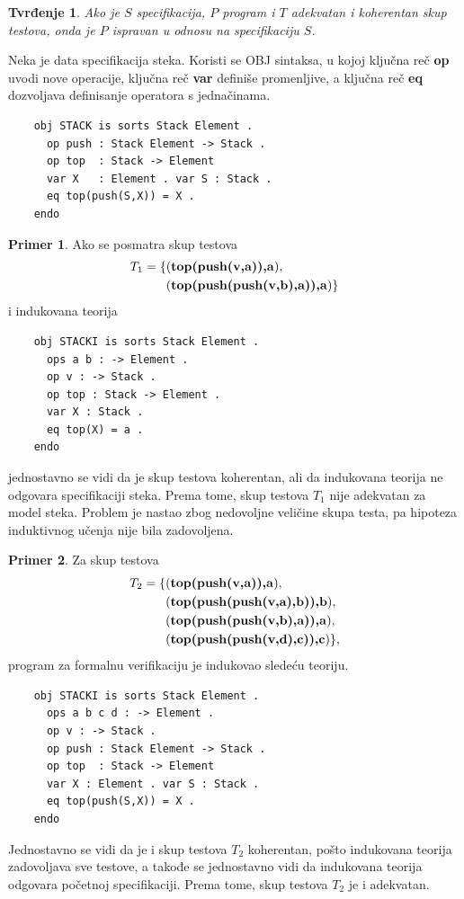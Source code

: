 \documentclass[a4paper]{article}
\newtheorem*{tvrdjenje}{Tvrđenje}
\theoremstyle{definition}
\newtheorem{primer}{Primer}[section]
\begin{document}
{\begin{tvrdjenje}
Ako je $S$ specifikacija, $P$ program i $T$ adekvatan i koherentan skup testova, onda je $P$ ispravan u odnosu na specifikaciju $S$.
\end{tvrdjenje}

Neka je data specifikacija steka. Koristi se OBJ sintaksa, u kojoj ključna reč \textbf{op} uvodi nove operacije, ključna reč \textbf{var} definiše promenljive, a ključna reč \textbf{eq} dozvoljava definisanje operatora s jednačinama.

\begin{verbatim}
	obj STACK is sorts Stack Element .
	  op push : Stack Element -> Stack .
	  op top  : Stack -> Element
	  var X   : Element . var S : Stack .
	  eq top(push(S,X)) = X .
	endo
\end{verbatim}

\begin{primer}
Ako se posmatra skup testova
\begin{eqnarray*}
T_1 = \{&(\mbox{\textbf{top(push(v,a)),a}}),\\
&(\mbox{\textbf{top(push(push(v,b),a)),a}})\}
\end{eqnarray*}
i indukovana teorija
\begin{verbatim}
	obj STACKI is sorts Stack Element .
	  ops a b : -> Element .
	  op v : -> Stack .
	  op top : Stack -> Element .
	  var X : Stack .
	  eq top(X) = a .
	endo	
\end{verbatim}
jednostavno se vidi da je skup testova koherentan, ali da indukovana teorija ne odgovara specifikaciji steka. Prema tome, skup testova $T_1$ nije adekvatan za model steka. Problem je nastao zbog nedovoljne veličine skupa testa, pa hipoteza induktivnog učenja nije bila zadovoljena.
\end{primer}

\begin{primer}
Za skup testova
\begin{eqnarray*}
T_2 = \{&(\mbox{\textbf{top(push(v,a)),a}}),\\
&(\mbox{\textbf{top(push(push(v,a),b)),b}}),\\
&(\mbox{\textbf{top(push(push(v,b),a)),a}}),\\
&(\mbox{\textbf{top(push(push(v,d),c)),c}})\},
\end{eqnarray*}
program za formalnu verifikaciju je indukovao sledeću teoriju.
\begin{verbatim}
	obj STACKI is sorts Stack Element .
	  ops a b c d : -> Element .
	  op v : -> Stack .
	  op push : Stack Element -> Stack .
	  op top  : Stack -> Element
	  var X : Element . var S : Stack .
	  eq top(push(S,X)) = X .
	endo
\end{verbatim}
Jednostavno se vidi da je i skup testova $T_2$ koherentan, pošto indukovana teorija zadovoljava sve testove, a takođe se jednostavno vidi da indukovana teorija odgovara početnoj specifikaciji. Prema tome, skup testova $T_2$ je i adekvatan.
\end{primer}

}
\end{document}
